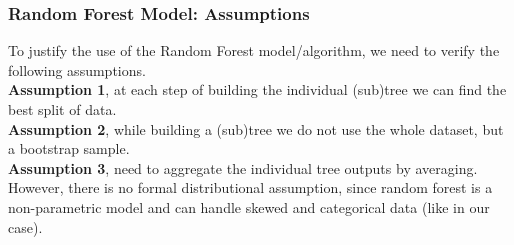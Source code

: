 \subsubsection{Random Forest Model: Assumptions}
To justify the use of the Random Forest model/algorithm, we need to verify the
following assumptions. \\
\textbf{Assumption 1}, at each step of building the individual (sub)tree
we can find the best split of data. \\
\textbf{Assumption 2}, while building a (sub)tree we do not use the whole
dataset, but a bootstrap sample. \\
\textbf{Assumption 3}, need to aggregate the individual tree outputs by
averaging. \\
However, there is no formal distributional assumption, since random forest is a
non-parametric model and can handle skewed and categorical data (like in our
case).
